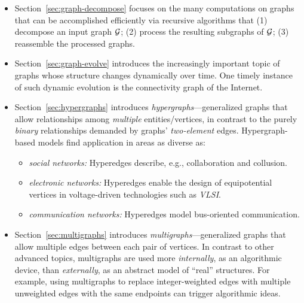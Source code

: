 \begin{itemize}
\item
Section~\ref{sec:graph-decompose} focuses on the many computations on graphs that can be accomplished efficiently via recursive algorithms that (1) decompose an input graph $\mbox{$\cal G$}$; (2) process the resulting subgraphs of $\mbox{$\cal G$}$; (3) reassemble the processed graphs.

 

\medskip\item
Section~\ref{sec:graph-evolve}  introduces the increasingly important topic of graphs whose structure changes dynamically over time.  One timely instance of such dynamic evolution is the connectivity graph of the Internet.

 

\medskip\item
Section~\ref{sec:hypergraphs} introduces {\it hypergraphs}---generalized graphs that allow relationships among {\em multiple} entities/vertices, in contrast to the purely {\em binary} relationships demanded by graphs' {\em two-element} edges.  Hypergraph-based models find application in areas as diverse as:
  \begin{itemize}
  \item
{\it social networks:} Hyperedges describe, e.g., collaboration and collusion.
  \medskip\item
{\it electronic networks:} Hyperedges enable the design of equipotential vertices in 
voltage-driven technologies such as {\it VLSI}.
  \medskip\item
{\it communication networks:} Hyperedges model bus-oriented communication.
  \end{itemize}

   

\medskip\item
Section~\ref{sec:multigraphs} introduces {\it multigraphs}---generalized graphs that allow multiple edges between each pair of vertices.  In contrast to other advanced topics, multigraphs are used more {\em internally}, as an algorithmic device, than {\em externally}, as an abstract model of ``real'' structures.  For example, using multigraphs to replace integer-weighted edges with multiple unweighted edges with the same endpoints can trigger algorithmic ideas.

 
\end{itemize}

